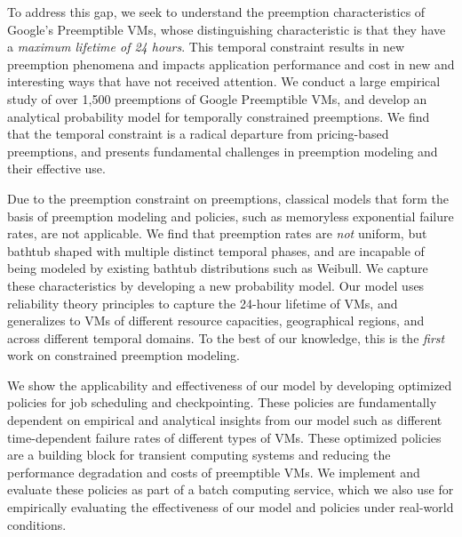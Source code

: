
To address this gap, we seek to understand the preemption characteristics of Google's Preemptible VMs, whose distinguishing characteristic is that they have a \emph{maximum lifetime of 24 hours}.
%
This temporal constraint results in new preemption phenomena and impacts application performance and cost in new and interesting ways that have not received attention.
%
We conduct a large empirical study of over 1,500 preemptions of Google Preemptible VMs, and develop an analytical probability model for temporally constrained preemptions.
%
We find that the temporal constraint is a radical departure from pricing-based preemptions, and presents fundamental challenges in preemption modeling and their effective use. %



Due to the preemption constraint on preemptions, classical models that form the basis of preemption modeling and policies, such as memoryless exponential failure rates, are not applicable.
We find that preemption rates are \emph{not} uniform, but bathtub shaped with multiple distinct temporal phases, and are incapable of being modeled by existing bathtub distributions such as Weibull. 
We capture these characteristics by developing a new probability model. 
Our model uses reliability theory principles to capture the 24-hour lifetime of VMs, and generalizes to VMs of different resource capacities, geographical regions, and across different temporal domains. 
To the best of our knowledge, this is the \emph{first} work on constrained preemption modeling. 
%


We show the applicability and effectiveness of our model by developing optimized policies for job scheduling and  checkpointing. 
These policies are fundamentally dependent on empirical and analytical insights from our model such as different time-dependent failure rates of different types of VMs. 
These optimized policies are a building block for transient computing systems and reducing the performance degradation and costs of preemptible VMs. 
We implement and evaluate these policies as part of a batch computing service, which we also use for empirically evaluating the effectiveness of our model and policies under real-world conditions. 



